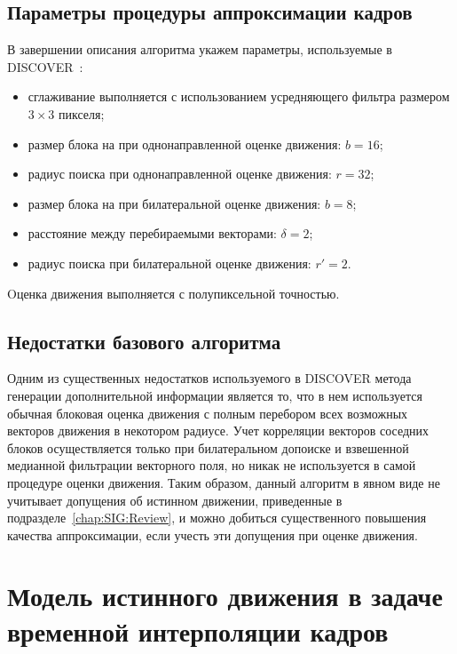 \subsection{Параметры процедуры аппроксимации кадров}

В завершении описания алгоритма укажем параметры, используемые в DISCOVER~\cite{Ascenso2005}:

\begin{itemize}
    \item сглаживание выполняется с использованием усредняющего фильтра размером $3\times3$ пикселя;
    \item размер блока на при однонаправленной оценке движения: $b=16$;
    \item радиус поиска при однонаправленной оценке движения: $r=32$;
    \item размер блока на при билатеральной оценке движения: $b=8$;
    \item расстояние между перебираемыми векторами: $\delta=2$;
    \item радиус поиска при билатеральной оценке движения: $r'=2$.
\end{itemize}

Oценка движения выполняется с полупиксельной точностью.

\subsection{Недостатки базового алгоритма}
\label{chap:SIG:ReferenceAlgo:Troubles}

Одним из существенных недостатков используемого в DISCOVER метода генерации дополнительной информации является то, что в нем используется обычная блоковая оценка движения с полным перебором всех возможных векторов движения в некотором радиусе. Учет корреляции векторов соседних блоков осуществляется только при билатеральном допоиске и взвешенной медианной фильтрации векторного поля, но никак не используется в самой процедуре оценки движения. Таким образом, данный алгоритм в явном виде не учитывает допущения об истинном движении, приведенные в подразделе~\ref{chap:SIG:Review}, и можно добиться существенного повышения качества аппроксимации, если учесть эти допущения при оценке движения.

\section{Модель истинного движения в задаче временной интерполяции кадров}
\label{chap:SIG:TrueMotionModel}

